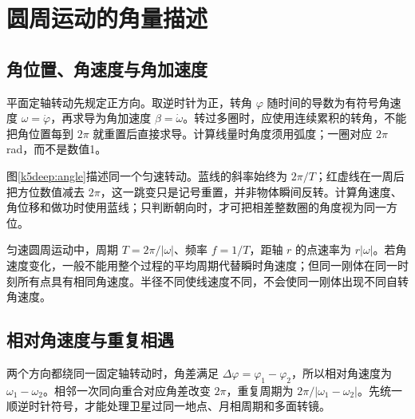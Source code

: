 \section{圆周运动的角量描述}
\subsection{角位置、角速度与角加速度}
平面定轴转动先规定正方向。取逆时针为正，转角 $\varphi$ 随时间的导数为有符号角速度 $\omega=\dot\varphi$，再求导为角加速度 $\beta=\dot\omega$。转过多圈时，应使用连续累积的转角，不能把角位置每到 $2\pi$ 就重置后直接求导。计算线量时角度须用弧度；一圈对应 $2\pi$rad，而不是数值1。

图\ref{k5deep:angle}描述同一个匀速转动。蓝线的斜率始终为 $2\pi/T$；红虚线在一周后把方位数值减去 $2\pi$，这一跳变只是记号重置，并非物体瞬间反转。计算角速度、角位移和做功时使用蓝线；只判断朝向时，才可把相差整数圈的角度视为同一方位。

匀速圆周运动中，周期 $T=2\pi/|\omega|$、频率 $f=1/T$，距轴 $r$ 的点速率为 $r|\omega|$。若角速度变化，一般不能用整个过程的平均周期代替瞬时角速度；但同一刚体在同一时刻所有点具有相同角速度。半径不同使线速度不同，不会使同一刚体出现不同自转角速度。

\subsection{相对角速度与重复相遇}
两个方向都绕同一固定轴转动时，角差满足 $\Delta\varphi=\varphi_1-\varphi_2$，所以相对角速度为 $\omega_1-\omega_2$。相邻一次同向重合对应角差改变 $2\pi$，重复周期为 $2\pi/|\omega_1-\omega_2|$。先统一顺逆时针符号，才能处理卫星过同一地点、月相周期和多面转镜。

